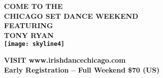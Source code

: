 
\fontsize{16}{20} \bfseries COME TO THE\\
\fontsize{26}{30} \bfseries CHICAGO SET DANCE WEEKEND\\
\fontsize{18}{20} \bfseries{\vspace*{1em}FEATURING\\}
\fontsize{36}{40}\bfseries TONY RYAN\\
\vspace*{0.5em}
\texttt{[image: skyline4]}

\fontsize{16}{20} \bfseries \vspace*{2em}VISIT www.irishdancechicago.com\\ 
\fontsize{16}{20} \bfseries {\vspace*{1em}Early Registration – Full Weekend \$70 (US)\\}


